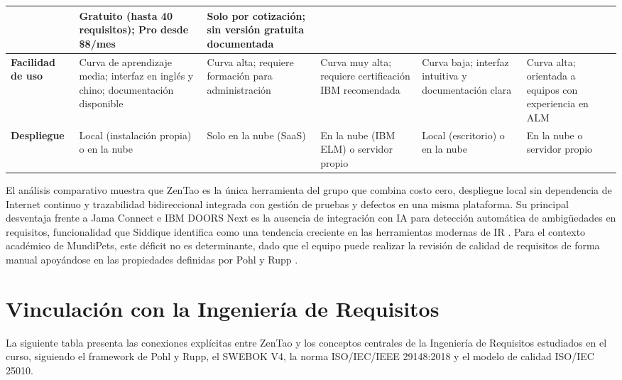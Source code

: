 \documentclass[journal,onecolumn]{IEEEtran}
\begin{document}
\begin{table}[H]
\begin{tabularx}{\textwidth}{|l|X|X|X|X|X|}
		& Gratuito (hasta 40 requisitos); Pro desde \$8/mes
		& Solo por cotización; sin versión gratuita documentada \\
		\hline
		\textbf{Facilidad de uso} \cite{hussain2022}
		& Curva de aprendizaje media; interfaz en inglés y chino; documentación disponible
		& Curva alta; requiere formación para administración
		& Curva muy alta; requiere certificación IBM recomendada
		& Curva baja; interfaz intuitiva y documentación clara
		& Curva alta; orientada a equipos con experiencia en ALM \\
		\hline
		\textbf{Despliegue} \cite{zentao2025}
		& Local (instalación propia) o en la nube
		& Solo en la nube (SaaS)
		& En la nube (IBM ELM) o servidor propio
		& Local (escritorio) o en la nube
		& En la nube o servidor propio \\
		\hline
	\end{tabularx}
\end{table}

El análisis comparativo muestra que ZenTao es la única herramienta del grupo que combina
costo cero, despliegue local sin dependencia de Internet continuo y trazabilidad bidireccional
integrada con gestión de pruebas y defectos en una misma plataforma. Su principal desventaja
frente a Jama Connect e IBM DOORS Next es la ausencia de integración con IA para detección
automática de ambigüedades en requisitos, funcionalidad que Siddique identifica como una
tendencia creciente en las herramientas modernas de IR \cite{siddique2023}. Para el contexto
académico de MundiPets, este déficit no es determinante, dado que el equipo puede realizar
la revisión de calidad de requisitos de forma manual apoyándose en las propiedades definidas
por Pohl y Rupp \cite{pohl2015}.


\newpage

\section{Vinculación con la Ingeniería de Requisitos}

La siguiente tabla presenta las conexiones explícitas entre ZenTao y los conceptos centrales
de la Ingeniería de Requisitos estudiados en el curso, siguiendo el framework de Pohl y Rupp,
el SWEBOK V4, la norma ISO/IEC/IEEE 29148:2018 y el modelo de calidad ISO/IEC 25010.
\end{document}
